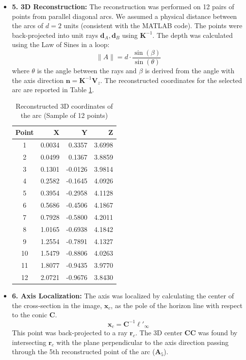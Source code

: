 \documentclass[a4paper,11pt]{article}
\newcommand{\matr}[1]{\bm{#1}}     %
\newcommand{\vect}[1]{\mathbf{#1}}  %
\begin{document}
\begin{itemize}
    \item \textbf{5. 3D Reconstruction:}
    The reconstruction was performed on 12 pairs of points from parallel diagonal arcs. We assumed a physical distance between the arcs of $d=2$ units (consistent with the MATLAB code).
    The points were back-projected into unit rays $\vect{d}_A, \vect{d}_B$ using $\matr{K}^{-1}$. The depth was calculated using the Law of Sines in a loop:
    \[
    \|A\| = d \cdot \frac{\sin(\beta)}{\sin(\theta)}
    \]
    where $\theta$ is the angle between the rays and $\beta$ is derived from the angle with the axis direction $\vect{n} = \matr{K}^{-1}\vect{V}_z$.
    The reconstructed coordinates for the selected arc are reported in Table \ref{tab:3d_points}.

    \begin{table}[H]
    \centering
    \caption{Reconstructed 3D coordinates of the arc (Sample of 12 points)}
    \label{tab:3d_points}
    \begin{tabular}{c r r r}
        \hline
        \textbf{Point} & \textbf{X} & \textbf{Y} & \textbf{Z} \\
        \hline
        1  & 0.0034 & 0.3357  & 3.6998 \\
        2  & 0.0499 & 0.1367  & 3.8859 \\
        3  & 0.1301 & -0.0126 & 3.9814 \\
        4  & 0.2582 & -0.1645 & 4.0926 \\
        5  & 0.3954 & -0.2958 & 4.1128 \\
        6  & 0.5686 & -0.4506 & 4.1867 \\
        7  & 0.7928 & -0.5800 & 4.2011 \\
        8  & 1.0165 & -0.6938 & 4.1842 \\
        9  & 1.2554 & -0.7891 & 4.1327 \\
        10 & 1.5479 & -0.8806 & 4.0263 \\
        11 & 1.8077 & -0.9435 & 3.9770 \\
        12 & 2.0721 & -0.9676 & 3.8430 \\
        \hline
    \end{tabular}
    \end{table}

    \item \textbf{6. Axis Localization:}
    The axis was localized by calculating the center of the cross-section in the image, $\vect{x}_c$, as the pole of the horizon line with respect to the conic $\matr{C}$.
    \[ \vect{x}_c = \matr{C}^{-1}\ell'_\infty \]
    This point was back-projected to a ray $\vect{r}_c$. The 3D center $\vect{CC}$ was found by intersecting $\vect{r}_c$ with the plane perpendicular to the axis direction passing through the 5th reconstructed point of the arc ($\vect{A}_5$).
    

\end{itemize}
\end{document}
